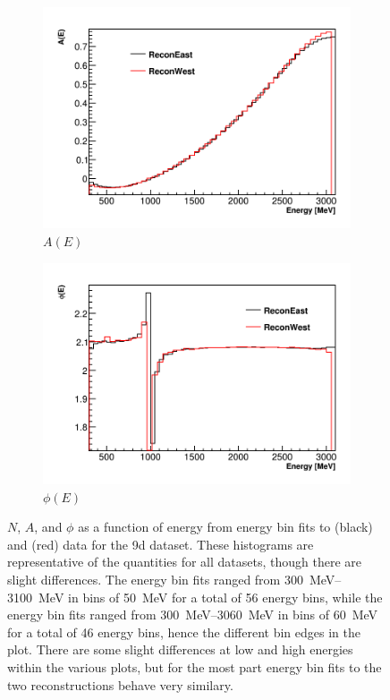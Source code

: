 \begin{figure}[]
    \begin{subfigure}[t]{0.45\textwidth}
        \centering
        \includegraphics[width=\textwidth]{ReconEastvWest_A}
        \caption{$A(E)$}
    \end{subfigure}
    \hspace{1mm}
    \begin{subfigure}[t]{0.45\textwidth}
        \centering
        \includegraphics[width=\textwidth]{ReconEastvWest_Phi}
        \caption{$\phi(E)$}
    \end{subfigure}
\caption[]{$N$, $A$, and $\phi$ as a function of energy from energy bin fits to \RE (black) and \RW (red) data for the 9d dataset. These histograms are representative of the quantities for all datasets, though there are slight differences. The \RE energy bin fits ranged from \SIrange{300}{3100}{\MeV} in bins of \SI{50}{\MeV} for a total of 56 energy bins, while the \RW energy bin fits ranged from \SIrange{300}{3060}{\MeV} in bins of \SI{60}{\MeV} for a total of 46 energy bins, hence the different bin edges in the plot. There are some slight differences at low and high energies within the various plots, but for the most part energy bin fits to the two reconstructions behave very similary.}
\label{fig:energyBinFits}
\end{figure}



